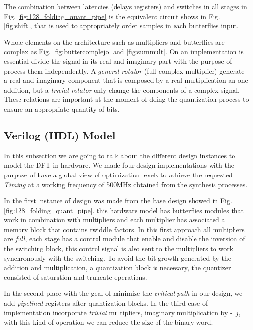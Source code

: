\documentclass[journal,comsoc]{IEEEtran}
\begin{document}
The combination between latencies (delays registers) and switches in all stages in Fig. \ref{fig:128_folding_quant_pipe} is the equivalent circuit shows in Fig. \ref{fig:shift}, that is used to appropriately order samples in each butterflies input.

Whole elements on the architecture such as multipliers and butterflies are complex as Fig. \ref{fig:buttercomplejo} and \ref{fig:summult}. On an implementation is essential divide the signal in its real and imaginary part with the purpose of process them independently. A \textit{general rotator} (full complex multiplier) generate a real and imaginary component that is composed by a real multiplication an one addition, but a \textit{trivial rotator} only change the components of a complex signal. These relations are important at the moment of doing the quantization process to ensure an appropriate quantity of bits.



\subsection{Verilog (HDL) Model} 
In this subsection we are going to talk about the different design instances to model the DFT in hardware. 
We made four design implementations with the purpose of have a global view of optimization levels to achieve the requested \textit{Timing} at a working frequency of 500MHz obtained from the synthesis processes.

In the first instance of design was made from the base design showed in Fig. \ref{fig:128_folding_quant_pipe}, this hardware model has butterflies modules that work in combination with multipliers and each multiplier has associated a memory block that contains twiddle factors. In this first approach all multipliers are \textit{full}, each stage has a control module that enable and disable the inversion of the switching block, this control signal is also sent to the multipliers to work synchronously with the switching. To avoid the bit growth generated by the addition and multiplication, a quantization block is necessary, the quantizer consisted of saturation and truncate operations.

In the second place with the goal of minimize the \textit{critical path} in our design, we add \textit{pipelined} registers after quantization blocks. In the third case of implementation incorporate \textit{trivial} multipliers, imaginary multiplication by -$1j$, with this kind of operation we can reduce the size of the binary word. 
\end{document}
